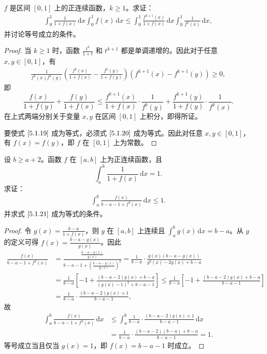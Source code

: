 \documentclass[../../main.tex]{subfiles}
\begin{document}
\begin{example}
\( f \) 是区间 \([0,1]\) 上的正连续函数，\( k \geqslant 1 \)。求证：
\begin{align}
\int_{0}^{1} \frac{1}{1 + f(x)} \, \mathrm{d}x \int_{0}^{1} f(x) \, \mathrm{d}x \leqslant \int_{0}^{1} \frac{f^{k + 1}(x)}{1 + f(x)} \, \mathrm{d}x \int_{0}^{1} \frac{1}{f^k(x)} \, \mathrm{d}x, \label{5.1.19}
\end{align}
并讨论等号成立的条件。
\end{example}
\begin{proof}
当 \( k \geqslant 1 \) 时，函数 \( \frac{t^k}{1 + t} \) 和 \( t^{k + 1} \) 都是单调递增的。因此对于任意 \( x, y \in [0,1] \)，有
\begin{align}
\frac{1}{f^k(x)f^k(y)} \left( \frac{f^k(x)}{1 + f(x)} - \frac{f^k(y)}{1 + f(y)} \right) \left( f^{k + 1}(x) - f^{k + 1}(y) \right) \geqslant 0, \label{5.1.20}
\end{align}
即
\[
\frac{f(x)}{1 + f(y)} + \frac{f(y)}{1 + f(x)} \leqslant \frac{f^{k + 1}(x)}{1 + f(x)} \cdot \frac{1}{f^k(y)} + \frac{f^{k + 1}(y)}{1 + f(y)} \cdot \frac{1}{f^k(x)}.
\]
在上式两端分别关于变量 \( x, y \) 在区间 \([0,1]\) 上积分，即得所证。

要使式 \(\eqref{5.1.19}\) 成为等式，必须式 \(\eqref{5.1.20}\) 成为等式。因此对任意 \( x, y \in [0,1] \)，有 \( f(x) = f(y) \)，即 \( f \) 在 \([0,1]\) 上为常数。
\end{proof}

\begin{example}
设 \( b \geqslant a + 2 \)。函数 \( f \) 在 \([a,b]\) 上为正连续函数，且
\[
\int_{a}^{b} \frac{1}{1 + f(x)} \, \mathrm{d}x = 1.
\]
求证：
\begin{align}
\int_{a}^{b} \frac{f(x)}{b - a - 1 + f^2(x)} \, \mathrm{d}x \leqslant 1. \label{5.1.21}
\end{align}
并求式 \(\eqref{5.1.21}\) 成为等式的条件。
\end{example}
\begin{proof}
令 \( g(x) = \frac{b - a}{1 + f(x)} \)，则 \( g \) 在 \([a,b]\) 上连续且 \( \int_{a}^{b} g(x) \, \mathrm{d}x = b - a \)。从 \( g \) 的定义可得 \( f(x) = \frac{b - a - g(x)}{g(x)} \)。因此
\begin{align*}
\frac{f(x)}{b-a-1+f^2(x)}&=\frac{\frac{b-a-g(x)}{g(x)}}{b-a-1+\left( \frac{b-a-g(x)}{g(x)} \right) ^2}=\frac{1}{b-a}\cdot \frac{g(x)(b-a-g(x))}{g^2(x)-2g(x)+b-a}
\\
&=\frac{1}{b-a}\left[ -1+\frac{(b-a-2)g(x)+b-a}{(g(x)-1)^2+b-a-1} \right] \leqslant \frac{1}{b-a}\left[ -1+\frac{(b-a-2)g(x)+b-a}{b-a-1} \right] 
\\
&=\frac{1}{b-a}\cdot \frac{(b-a-2)g(x)+1}{b-a-1},
\end{align*}
故
\begin{align*}
\int_a^b{\frac{f(x)}{b-a-1+f^2(x)}\,\mathrm{d}x}&\leqslant \int_a^b{\frac{1}{b-a}}\cdot \frac{(b-a-2)g(x)+1}{b-a-1}\,\mathrm{d}x
\\
&=\frac{1}{b-a}\cdot \frac{(b-a-2)(b-a)+b-a}{b-a-1}=1.
\end{align*}
等号成立当且仅当 \( g(x) = 1 \)，即 \( f(x) = b - a - 1 \) 时成立。
\end{proof}
\end{document}
